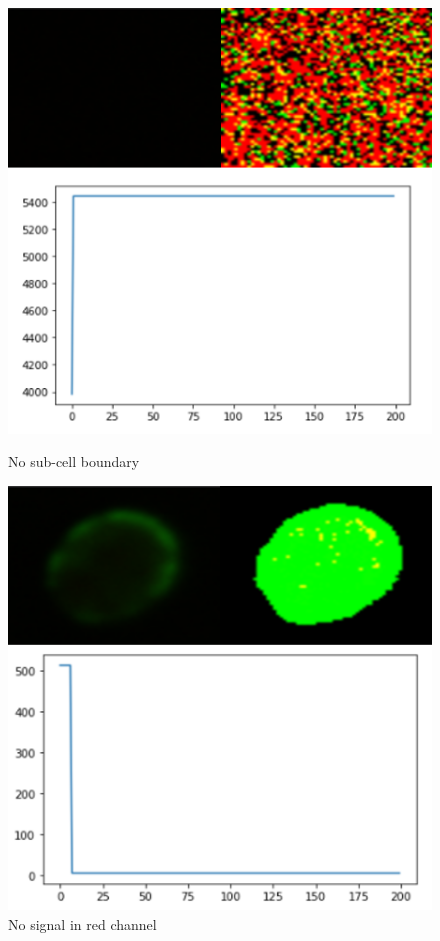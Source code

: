 \documentclass[12pt]{article}
\begin{document}
\begin{figure}[!htbp]
\centering
\begin{minipage}[t]{0.48\textwidth}
\centering
\includegraphics[width=\textwidth]{excep-1.png}
\caption{No sub-cell boundary}
\label{fig:excep-1}
\end{minipage}
\begin{minipage}[t]{0.48\textwidth}
\centering
\includegraphics[width=\textwidth]{excep-2.png}
\caption{No signal in red channel}
\label{fig:excep-2}
\end{minipage}
\end{figure}
\end{document}
